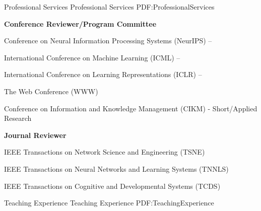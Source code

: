 \documentclass[letterpaper,MMMyyyy,nonstopmode]{simpleresumecv}
\begin{document}
\begin{Body}

\Section
{Professional \newline
Services}
{Professional Services}
{PDF:ProfessionalServices}

\textbf{Conference Reviewer/Program Committee}

\BulletItem
Conference on Neural Information Processing Systems (NeurIPS)
\hfill
{} --


\BulletItem
International Conference on Machine Learning (ICML)
\hfill
{} --

\BulletItem
International Conference on Learning Representations (ICLR)
\hfill
{} --

\BulletItem
The Web Conference (WWW)
\hfill
{}

\BulletItem
Conference on Information and Knowledge Management (CIKM) - Short/Applied Research
\hfill
{}






\Gap
\textbf{Journal Reviewer}  

\BulletItem
IEEE Transactions on Network Science and Engineering (TSNE)
\hfill
{}

\BulletItem
IEEE Transactions on Neural Networks and Learning Systems (TNNLS)
\hfill
{}

\BulletItem
IEEE Transactions on Cognitive and Developmental Systems (TCDS)
\hfill
{}


\Section
{Teaching \newline
Experience}
{Teaching Experience}
{PDF:TeachingExperience}


\end{Body}
\end{document}
